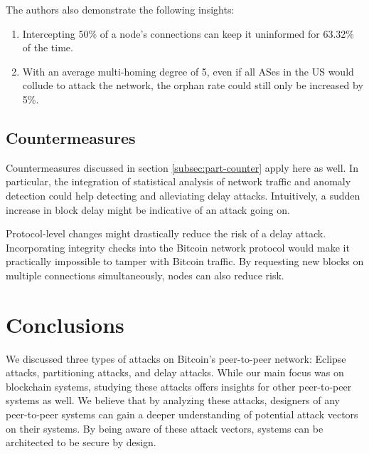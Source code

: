 \documentclass[12pt]{article}
\begin{document}
The authors also demonstrate the following insights:

\begin{enumerate}
    \item Intercepting 50\% of a node's connections can keep it uninformed for 63.32\% of the time.
    \item With an average multi-homing degree of 5, even if all ASes in the US would collude to attack the network, the orphan rate could still only be increased by 5\%.
\end{enumerate}

\subsection{Countermeasures}

Countermeasures discussed in section \ref{subsec:part-counter} apply here as well. In particular, the integration of statistical analysis of network traffic and anomaly detection could help detecting and alleviating delay attacks. Intuitively, a sudden increase in block delay might be indicative of an attack going on.

Protocol-level changes might drastically reduce the risk of a delay attack. Incorporating integrity checks into the Bitcoin network protocol would make it practically impossible to tamper with Bitcoin traffic. By requesting new blocks on multiple connections simultaneously, nodes can also reduce risk.


\section{Conclusions}
\label{sec:conclusion}

We discussed three types of attacks on Bitcoin's peer-to-peer network: Eclipse attacks, partitioning attacks, and delay attacks. While our main focus was on blockchain systems, studying these attacks offers insights for other peer-to-peer systems as well. We believe that by analyzing these attacks, designers of any peer-to-peer systems can gain a deeper understanding of potential attack vectors on their systems. By being aware of these attack vectors, systems can be architected to be secure by design.
\end{document}
